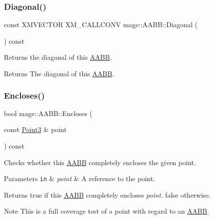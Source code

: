 \subsubsection{\texorpdfstring{Diagonal()}{Diagonal()}}
{\footnotesize\ttfamily const X\+M\+V\+E\+C\+T\+OR X\+M\+\_\+\+C\+A\+L\+L\+C\+O\+NV mage\+::\+A\+A\+B\+B\+::\+Diagonal (\begin{DoxyParamCaption}{ }\end{DoxyParamCaption}) const\hspace{0.3cm}{\ttfamily [noexcept]}}

Returns the diagonal of this \mbox{\hyperlink{classmage_1_1_a_a_b_b}{A\+A\+BB}}.

\begin{DoxyReturn}{Returns}
The diagonal of this \mbox{\hyperlink{classmage_1_1_a_a_b_b}{A\+A\+BB}}. 
\end{DoxyReturn}
\mbox{\label{classmage_1_1_a_a_b_b_a308fce591178a9aeaed3838dfa32972f}} 
\subsubsection{\texorpdfstring{Encloses()}{Encloses()}\hspace{0.1cm}{\footnotesize\ttfamily [1/4]}}
{\footnotesize\ttfamily bool mage\+::\+A\+A\+B\+B\+::\+Encloses (\begin{DoxyParamCaption}\item[{const \mbox{\hyperlink{structmage_1_1_point3}{Point3}} \&}]{point }\end{DoxyParamCaption}) const\hspace{0.3cm}{\ttfamily [noexcept]}}

Checks whether this \mbox{\hyperlink{classmage_1_1_a_a_b_b}{A\+A\+BB}} completely encloses the given point.


\begin{DoxyParams}[1]{Parameters}
\mbox{\tt in}  & {\em point} & A reference to the point. \\
\hline
\end{DoxyParams}
\begin{DoxyReturn}{Returns}
{\ttfamily true} if this \mbox{\hyperlink{classmage_1_1_a_a_b_b}{A\+A\+BB}} completely encloses {\itshape point}. {\ttfamily false} otherwise. 
\end{DoxyReturn}
\begin{DoxyNote}{Note}
This is a full coverage test of a point with regard to an \mbox{\hyperlink{classmage_1_1_a_a_b_b}{A\+A\+BB}}. 
\end{DoxyNote}
\mbox{\label{classmage_1_1_a_a_b_b_a97e3f57fc91e4fea04572382c94f4279}} 
